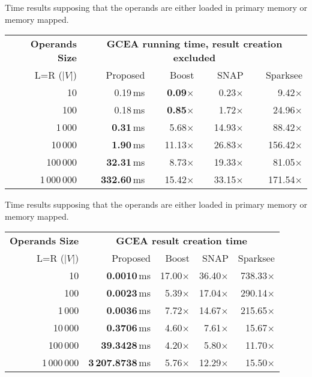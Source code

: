 \begin{multilucido}[GCEA]
	\begin{sottolucido}
		Time results supposing that the operands are either loaded in primary memory or
		memory mapped. 
		\begin{tabular}{r|r|rrr}
			\toprule
			\textbf{Operands Size} & \multicolumn{4}{c}{\textbf{GCEA running time, result creation excluded}}\\
			L=R ($|V|$)  &Proposed  & Boost  & SNAP  & Sparksee  \\
			\midrule
			10 & 0.19\,ms & \textbf{0.09}$\times$ & 0.23$\times$ &  9.42$\times$ \\
			100  & 0.18\,ms & \textbf{0.85}$\times$ & 1.72$\times$ & 24.96$\times$ \\
			1\,000  & \textbf{0.31}\,ms & 5.68$\times$ &14.93$\times$ & 88.42$\times$ \\
			10\,000  & \textbf{1.90}\,ms &11.13$\times$ & 26.83$\times$ & 156.42$\times$ \\
			100\,000  & \textbf{32.31}\,ms & 8.73$\times$ & 19.33$\times$ & 81.05$\times$ \\
			1\,000\,000  &  \textbf{332.60}\,ms & 15.42$\times$ & 33.15$\times$ & 171.54$\times$ \\
			\bottomrule
		\end{tabular}
	\end{sottolucido}

	\begin{sottolucido}
			Time results supposing that the operands are either loaded in primary memory or
		memory mapped. 
		\begin{tabular}{r|r|rrr}
			\toprule
			\textbf{Operands Size} & \multicolumn{4}{c}{\textbf{GCEA result creation time}}\\
			L=R ($|V|$)  &Proposed  & Boost  & SNAP  & Sparksee  \\
			\midrule
			10 & \textbf{0.0010}\,ms & 17.00$\times$ & 36.40$\times$ & 738.33$\times$\\
			100  & \textbf{0.0023}\,ms &  5.39$\times$ & 17.04$\times$ & 290.14$\times$\\
			1\,000  &  \textbf{0.0036}\,ms &  7.72$\times$ & 14.67$\times$ & 215.65$\times$\\
			10\,000  &  \textbf{0.3706}\,ms &  4.60$\times$ &  7.61$\times$ &  15.67$\times$\\
			100\,000  & \textbf{39.3428}\,ms &  4.20$\times$ &  5.80$\times$ &  11.70$\times$\\
			1\,000\,000  &  \textbf{3\,207.8738}\,ms &  5.76$\times$ & 12.29$\times$ &  15.50$\times$\\
			\bottomrule
		\end{tabular}
	\end{sottolucido}


\end{multilucido}

